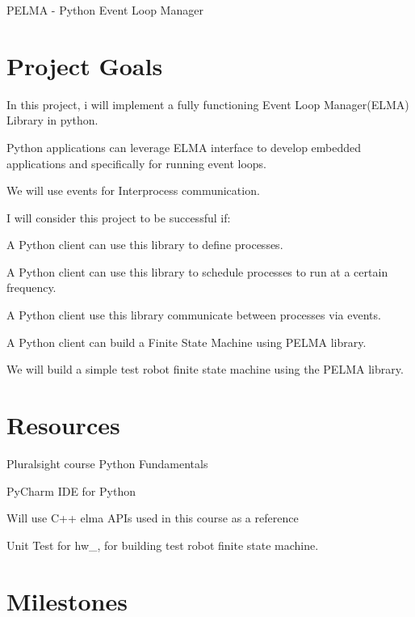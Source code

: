 P\+E\+L\+MA -\/ Python Event Loop Manager

\section*{Project Goals}


\begin{DoxyItemize}
\item In this project, i will implement a fully functioning Event Loop Manager(\+E\+L\+M\+A) Library in python.
\item Python applications can leverage E\+L\+MA interface to develop embedded applications and specifically for running event loops.
\item We will use events for Interprocess communication.
\end{DoxyItemize}

I will consider this project to be successful if\+:
\begin{DoxyItemize}
\item A Python client can use this library to define processes.
\item A Python client can use this library to schedule processes to run at a certain frequency.
\item A Python client use this library communicate between processes via events.
\item A Python client can build a Finite State Machine using P\+E\+L\+MA library.
\end{DoxyItemize}

We will build a simple test robot finite state machine using the P\+E\+L\+MA library.

\section*{Resources}


\begin{DoxyItemize}
\item Pluralsight course Python Fundamentals
\item Py\+Charm I\+DE for Python
\item Will use C++ elma A\+PI\textquotesingle{}s used in this course as a reference
\item Unit Test for hw\+\_, for building test robot finite state machine.
\end{DoxyItemize}

\section*{Milestones}


